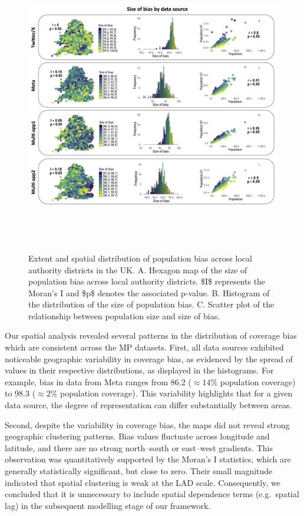 \documentclass{article}
\begin{document}
\begin{figure}
\centering
\includegraphics[width=14cm,height=13cm]{figures/Fig-size-bias.png}
\caption{Extent and spatial distribution of population bias across local
authority districts in the UK. A. Hexagon map of the size of population
bias across local authority districts. \$I\$ represents the Moran's I
and \$p\$ denotes the associated p-value. B. Histogram of the
distribution of the size of population bias. C. Scatter plot of the
relationship between population size and size of
bias.}\label{fig:bias-size}
\end{figure}

Our spatial analysis revealed several patterns in the distribution of
coverage bias which are consistent across the MP
datasets. First, all data sources exhibited noticeable geographic
variability in coverage bias, as evidenced by the spread of values in
their respective distributions, as displayed in the histograms. For
example, bias in data from Meta ranges from 86.2 (\(\approx 14\%\)
population coverage) to 98.3 (\(\approx 2\%\) population coverage). This
variability highlights that for a given data source, the degree of
representation can differ substantially between areas.

Second, despite the variability in coverage bias, the maps did not
reveal strong geographic clustering patterns. Bias values fluctuate
across longitude and latitude, and there are no strong north--south or
east--west gradients. This observation was quantitatively supported by
the Moran's I statistics, which are generally statistically significant,
but close to zero. Their small magnitude indicated that spatial
clustering is weak at the LAD scale. Consequently, we concluded that it
is unnecessary to include spatial dependence terms (e.g.~spatial lag) in
the subsequent modelling stage of our framework.
\end{document}
